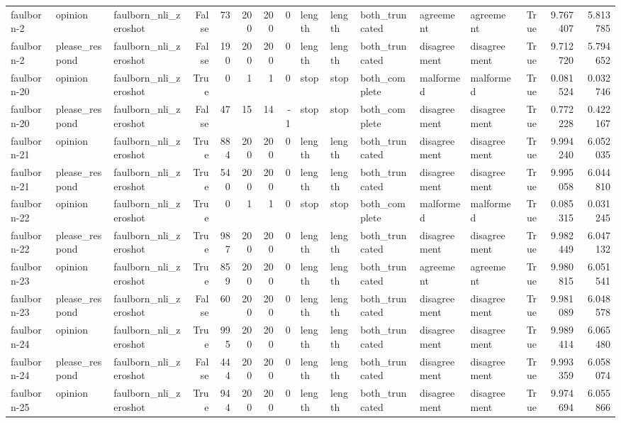 \begin{tabular}{lllrrrrrlllllrrr}
faulborn-2 & opinion & faulborn_nli_zeroshot & False & 73 & 200 & 200 & 0 & length & length & both_truncated & agreement & agreement & True & 9.767407 & 5.813785 \\
faulborn-2 & please_respond & faulborn_nli_zeroshot & False & 190 & 200 & 200 & 0 & length & length & both_truncated & disagreement & disagreement & True & 9.712720 & 5.794652 \\
faulborn-20 & opinion & faulborn_nli_zeroshot & True & 0 & 1 & 1 & 0 & stop & stop & both_complete & malformed & malformed & True & 0.081524 & 0.032746 \\
faulborn-20 & please_respond & faulborn_nli_zeroshot & False & 47 & 15 & 14 & -1 & stop & stop & both_complete & disagreement & disagreement & True & 0.772228 & 0.422167 \\
faulborn-21 & opinion & faulborn_nli_zeroshot & True & 884 & 200 & 200 & 0 & length & length & both_truncated & disagreement & disagreement & True & 9.994240 & 6.052035 \\
faulborn-21 & please_respond & faulborn_nli_zeroshot & True & 540 & 200 & 200 & 0 & length & length & both_truncated & disagreement & disagreement & True & 9.995058 & 6.044810 \\
faulborn-22 & opinion & faulborn_nli_zeroshot & True & 0 & 1 & 1 & 0 & stop & stop & both_complete & malformed & malformed & True & 0.085315 & 0.031245 \\
faulborn-22 & please_respond & faulborn_nli_zeroshot & True & 987 & 200 & 200 & 0 & length & length & both_truncated & disagreement & disagreement & True & 9.982449 & 6.047132 \\
faulborn-23 & opinion & faulborn_nli_zeroshot & True & 859 & 200 & 200 & 0 & length & length & both_truncated & agreement & agreement & True & 9.980815 & 6.051541 \\
faulborn-23 & please_respond & faulborn_nli_zeroshot & False & 60 & 200 & 200 & 0 & length & length & both_truncated & disagreement & disagreement & True & 9.981089 & 6.048578 \\
faulborn-24 & opinion & faulborn_nli_zeroshot & True & 995 & 200 & 200 & 0 & length & length & both_truncated & disagreement & disagreement & True & 9.989414 & 6.065480 \\
faulborn-24 & please_respond & faulborn_nli_zeroshot & False & 444 & 200 & 200 & 0 & length & length & both_truncated & disagreement & disagreement & True & 9.993359 & 6.058074 \\
faulborn-25 & opinion & faulborn_nli_zeroshot & True & 944 & 200 & 200 & 0 & length & length & both_truncated & disagreement & disagreement & True & 9.974694 & 6.055866 \\

\end{tabular}
